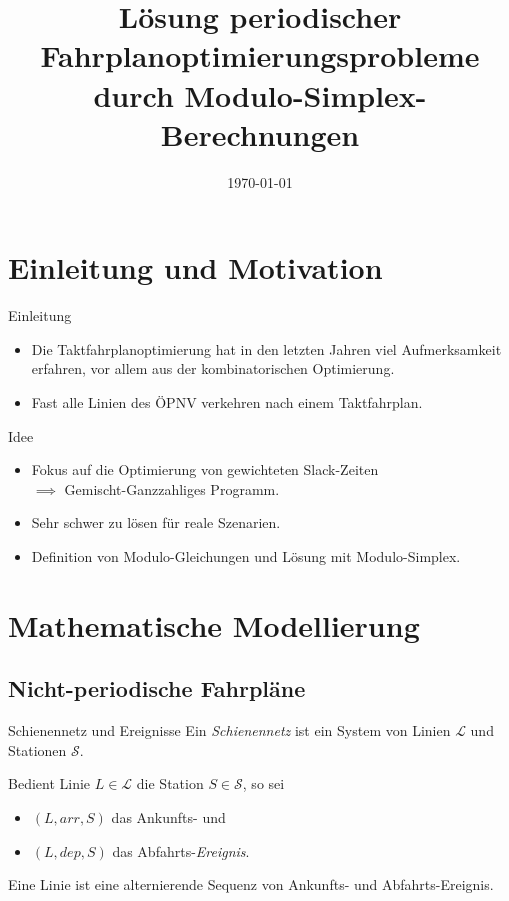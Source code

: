 \documentclass[accentcolor = tud11b, colorbacktitle, landscape, german, presentation, tudmathserif]{tudbeamer}
\title{Lösung periodischer Fahrplanoptimierungsprobleme durch Modulo-Simplex-Berechnungen}
\institute{Fabian Damken}
\date{\today}
\newcommand{\arr}{\mathit{arr}}
\newcommand{\dep}{\mathit{dep}}
\begin{document}
	
	
	\begin{titleframe}
	\end{titleframe}

	\section{Einleitung und Motivation}
		\begin{frame}{Einleitung}
			\begin{itemize}
				\item Die Taktfahrplanoptimierung hat in den letzten Jahren viel Aufmerksamkeit erfahren, vor allem aus der kombinatorischen Optimierung.
				\item Fast alle Linien des ÖPNV verkehren nach einem Taktfahrplan.
			\end{itemize}
		\end{frame}
	
		\begin{frame}{Idee}
			\begin{itemize}
				\item Fokus auf die Optimierung von gewichteten Slack-Zeiten \\\(\implies\) Gemischt-Ganzzahliges Programm.
				\item Sehr schwer zu lösen für reale Szenarien.
				\item Definition von Modulo-Gleichungen und Lösung mit Modulo-Simplex.
			\end{itemize}
		\end{frame}
	
	\section{Mathematische Modellierung}
		\subsection{Nicht-periodische Fahrpläne}
			\begin{frame}{Schienennetz und Ereignisse}
				Ein \emph{Schienennetz} ist ein System von Linien \(\mathcal{L}\) und Stationen \(\mathcal{S}\).
			
				\vspace{1cm}
				Bedient Linie \( L \in \mathcal{L} \) die Station \( S \in \mathcal{S} \), so sei
				\begin{itemize}
					\item \( (L, \arr, S) \) \tabto{1.7cm} das Ankunfts- und
					\item \( (L, \dep, S) \) \tabto{1.7cm} das Abfahrts-\emph{Ereignis}.
				\end{itemize}
			
				Eine Linie ist eine alternierende Sequenz von Ankunfts- und Abfahrts-Ereignis.
			\end{frame}
		
\end{document}

